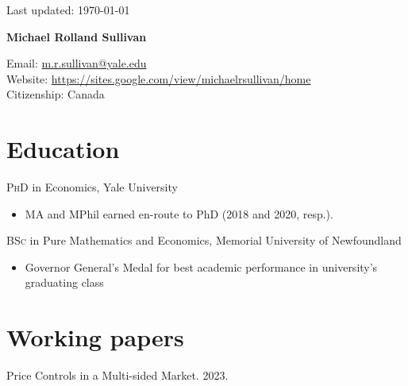 \documentclass[11pt]{article} %
\begin{document}
 \begin{flushright}
   \scriptsize
	Last updated: \today
   \normalsize
\end{flushright}
{\LARGE\bfseries Michael Rolland Sullivan} %
\bigskip\bigskip\medskip %

\medskip %

Email: \href{mailto:m.r.sullivan@yale.edu}{m.r.sullivan@yale.edu}\\ 
Website: \href{https://sites.google.com/view/michaelrsullivan/home}{https://sites.google.com/view/michaelrsullivan/home}\\ 

Citizenship: Canada 

%

\section*{Education}

\textsc{PhD} in Economics, Yale University 
\begin{itemize}
	\item MA and MPhil earned en-route to PhD (2018 and 2020, resp.).
\end{itemize}

\textsc{BSc} in Pure Mathematics and Economics, Memorial University of Newfoundland
\begin{itemize}
	\item Governor General's Medal for best academic performance in university's graduating class
\end{itemize}

\section*{Working papers}

Price Controls in a Multi-sided Market. 2023. 
\end{document}
